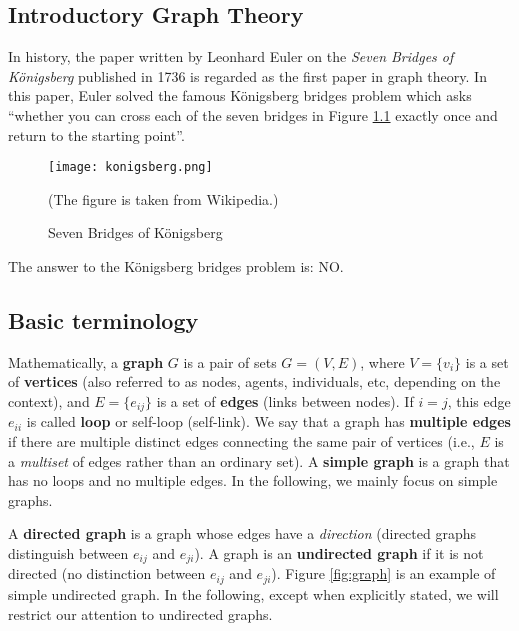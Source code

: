 \documentclass[11pt, A4paper, openany, uplatex]{book}
\begin{document}
\begin{appendices}

\chapter{Introductory Graph Theory}

In history, the paper written by Leonhard Euler on the \textit{Seven Bridges of K\"onigsberg} published in 1736 is regarded as the first paper in graph theory. 
In this paper, Euler solved the famous K\"onigsberg bridges problem which asks ``whether you can cross each of the seven bridges in Figure \ref{fig:konig} exactly once and return to the starting point''.

\begin{figure}[h!]
	\begin{center}
		\texttt{[image: konigsberg.png]}
		\caption{Seven Bridges of K\"onigsberg\label{fig:konig}}
		\footnotesize{(The figure is taken from Wikipedia.)}\normalsize
	\end{center}
\end{figure}

The answer to the K\"onigsberg bridges problem is: NO.
 
\section{Basic terminology}

Mathematically, a \textbf{graph} $G$ is a pair of sets $G =(V, E)$, where $V = \{v_i\}$ is a set of \textbf{vertices} (also referred to as nodes, agents, individuals, etc, depending on the context), and $E = \{e_{ij}\}$ is a set of \textbf{edges} (links between nodes).
If $i = j$, this edge $e_{ii}$ is called \textbf{loop} or self-loop (self-link).
We say that a graph has \textbf{multiple edges} if there are multiple distinct edges connecting the same pair of vertices (i.e., $E$ is a \textit{multiset} of edges rather than an ordinary set).
A \textbf{simple graph} is a graph that has no loops and no multiple edges.
In the following, we mainly focus on simple graphs. 

A \textbf{directed graph} is a graph whose edges have a \textit{direction} (directed graphs distinguish between $e_{ij}$ and $e_{ji}$).
A graph is an \textbf{undirected graph} if it is not directed (no distinction between $e_{ij}$ and $e_{ji}$).
Figure \ref{fig:graph} is an example of simple undirected graph.
In the following, except when explicitly stated, we will restrict our attention to undirected graphs.


\end{appendices}
\end{document}
